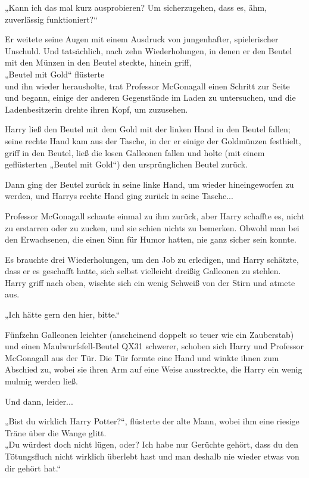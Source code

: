 {„Kann ich das mal kurz ausprobieren? Um sicherzugehen, dass es, ähm, zuverlässig funktioniert?“

Er weitete seine Augen mit einem Ausdruck von jungenhafter, spielerischer Unschuld. Und tatsächlich, nach zehn Wiederholungen, in denen er den Beutel mit den Münzen in den Beutel steckte, hinein griff,\\ „Beutel mit Gold“ flüsterte\\ und ihn wieder herausholte, trat Professor McGonagall einen Schritt zur Seite und begann, einige der anderen Gegenstände im Laden zu untersuchen, und die Ladenbesitzerin drehte ihren Kopf, um zuzusehen.

Harry ließ den Beutel mit dem Gold mit der linken Hand in den Beutel fallen; seine rechte Hand kam aus der Tasche, in der er einige der Goldmünzen festhielt, griff in den Beutel, ließ die losen Galleonen fallen und holte (mit einem geflüsterten „Beutel mit Gold“) den ursprünglichen Beutel zurück.

Dann ging der Beutel zurück in seine linke Hand, um wieder hineingeworfen zu werden, und Harrys rechte Hand ging zurück in seine Tasche...

Professor McGonagall schaute einmal zu ihm zurück, aber Harry schaffte es, nicht zu erstarren oder zu zucken, und sie schien nichts zu bemerken. Obwohl man bei den Erwachsenen, die einen Sinn für Humor hatten, nie ganz sicher sein konnte.

Es brauchte drei Wiederholungen, um den Job zu erledigen, und Harry schätzte, dass er es geschafft hatte, sich selbst vielleicht dreißig Galleonen zu stehlen. Harry griff nach oben, wischte sich ein wenig Schweiß von der Stirn und atmete aus.

„Ich hätte gern den hier, bitte.“

Fünfzehn Galleonen leichter (anscheinend doppelt so teuer wie ein Zauberstab) und einen Maulwurfsfell-Beutel QX31 schwerer, schoben sich Harry und Professor McGonagall aus der Tür. Die Tür formte eine Hand und winkte ihnen zum Abschied zu, wobei sie ihren Arm auf eine Weise ausstreckte, die Harry ein wenig mulmig werden ließ.

Und dann, leider...

„Bist du wirklich Harry Potter?“, flüsterte der alte Mann, wobei ihm eine riesige Träne über die Wange glitt.\\ „Du würdest doch nicht lügen, oder? Ich habe nur Gerüchte gehört, dass du den Tötungsfluch nicht wirklich überlebt hast und man deshalb nie wieder etwas von dir gehört hat.“

}
